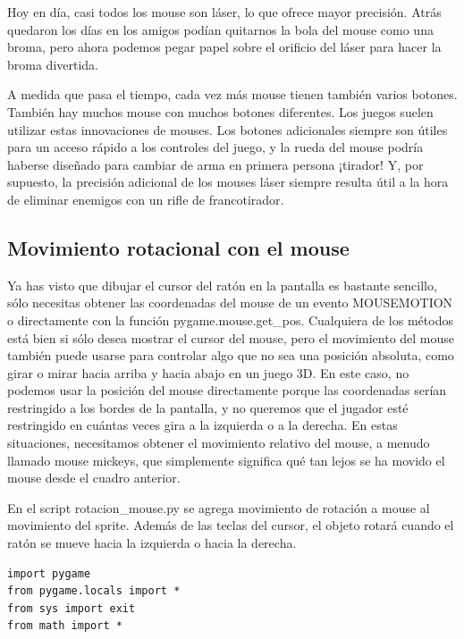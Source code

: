 {Hoy en día, casi todos los mouse son láser, lo que ofrece mayor precisión. Atrás quedaron los días en los
amigos podían quitarnos la bola del mouse como una broma, pero ahora podemos pegar papel sobre el orificio del láser para
hacer la broma divertida.

A medida que pasa el tiempo, cada vez más mouse tienen también varios botones. También hay muchos mouse con muchos botones diferentes.
Los juegos suelen utilizar estas innovaciones de mouses. Los botones adicionales siempre son útiles para un acceso rápido
a los controles del juego, y la rueda del mouse podría haberse diseñado para cambiar de arma en primera persona
¡tirador! Y, por supuesto, la precisión adicional de los mouses láser siempre resulta útil a la hora de eliminar enemigos con un rifle de francotirador.



\subsection{Movimiento rotacional con el mouse}

Ya has visto que dibujar el cursor del ratón en la pantalla es bastante sencillo, sólo necesitas
obtener las coordenadas del mouse de un evento {\ttfamily MOUSEMOTION} o directamente con la función  {\ttfamily pygame.mouse.get\_pos}. Cualquiera de los métodos está bien si sólo desea mostrar el cursor del mouse, pero el movimiento del mouse también puede
usarse para controlar algo  que no sea una posición absoluta, como girar o mirar hacia arriba y hacia abajo
en un juego 3D. En este caso, no podemos usar la posición del mouse directamente porque las coordenadas serían
restringido a los bordes de la pantalla, y no queremos que el jugador esté restringido en cuántas veces
gira a la izquierda o a la derecha. En estas situaciones, necesitamos  obtener el movimiento relativo del mouse, a menudo llamado
{\ttfamily mouse mickeys}, que simplemente significa qué tan lejos se ha movido el mouse desde el cuadro anterior.


En el script {\ttfamily rotacion\_mouse.py} se  agrega movimiento de rotación a mouse al movimiento del sprite.
Además de las teclas del cursor, el objeto rotará cuando el ratón se mueve hacia la izquierda o hacia la derecha.




\hspace{-2.9cm}{\ttfamily \scriptsize rotacion}

\vspace{-0.2cm}
\hspace{-2.5cm}{\ttfamily \scriptsize \_mouse.py}\vspace{-0.84cm}
\begin{lstlisting}		
import pygame
from pygame.locals import *
from sys import exit
from math import *


\end{lstlisting}}
